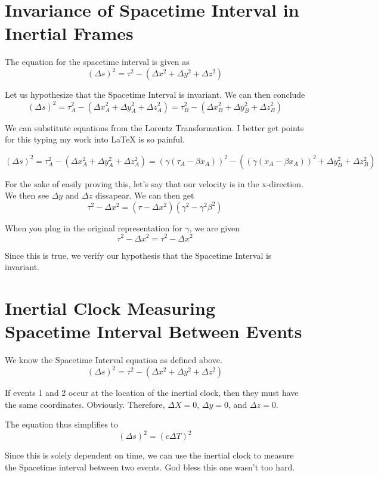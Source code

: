 \documentclass{article}
\begin{document}
\section{Invariance of Spacetime Interval in Inertial Frames}
\begin{center}
  The equation for the spacetime interval is given as
  \[
    (\Delta s)^2 = \tau^2 - (\Delta x^2 + \Delta y^2 + \Delta z^2)
  \]
  
  Let us hypothesize that the Spacetime Interval is invariant. We can then conclude
  \[
    (\Delta s)^2 = \tau_A^2 - (\Delta x_A^2 + \Delta y_A^2 + \Delta z_A^2) = \tau_B^2 - (\Delta x_B^2 + \Delta y_B^2 + \Delta z_B^2)
  \]
  
  We can substitute equations from the Lorentz Transformation. I better get points for this typing my work into LaTeX is so painful.

  \[
    (\Delta s)^2 = \tau_A^2 - (\Delta x_A^2 + \Delta y_A^2 + \Delta z_A^2) = (\gamma (\tau_A - \beta x_A))^2 - ((\gamma (x_A - \beta x_A))^2 + \Delta y_B^2 + \Delta z_B^2)
  \]
  
  For the sake of easily proving this, let's say that our velocity is in the x-direction. We then see \(\Delta y\) and \(\Delta z\) dissapear. We can then get
  \[
    \tau^2 - \Delta x^2 = (\tau - \Delta x^2)(\gamma^2 - \gamma^2 \beta^2)
  \]
  
  When you plug in the original representation for \(\gamma\), we are given
  \[
    \tau^2 - \Delta x^2 = \tau^2 - \Delta x^2
  \]
  
  Since this is true, we verify our hypothesis that the Spacetime Interval is invariant.
\end{center}
\newpage
\section{Inertial Clock Measuring Spacetime Interval Between Events}
We know the Spacetime Interval equation as defined above.
\[
  (\Delta s)^2 = \tau^2 - (\Delta x^2 + \Delta y^2 + \Delta z^2)
\]

If events 1 and 2 occur at the location of the inertial clock, then they must have the same coordinates. Obviously. Therefore, \(\Delta X = 0\), \(\Delta y = 0\), and \(\Delta z = 0\).

The equation thus simplifies to
\[
  (\Delta s)^2 = (c\Delta T)^2
\]

Since this is solely dependent on time, we can use the inertial clock to measure the Spacetime interval between two events. God bless this one wasn't too hard.
\newpage
\end{document}
